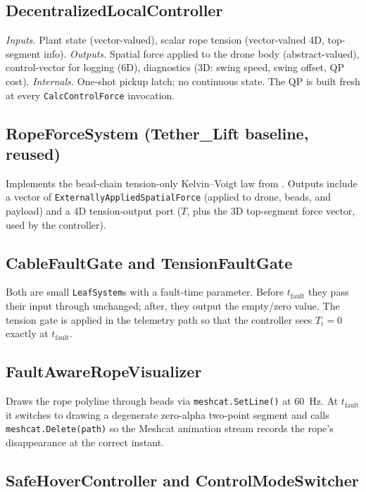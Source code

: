 \documentclass[11pt,a4paper,oneside]{report}
\begin{document}
\subsection{DecentralizedLocalController}

\emph{Inputs.} Plant state (vector-valued), scalar rope tension
(vector-valued 4D, top-segment info). \emph{Outputs.} Spatial force
applied to the drone body (abstract-valued), control-vector for
logging (6D), diagnostics (3D: swing speed, swing offset, QP cost).
\emph{Internals.} One-shot pickup latch; no continuous state. The QP
is built fresh at every \texttt{CalcControlForce} invocation.

\subsection{RopeForceSystem (Tether\_Lift baseline, reused)}

Implements the bead-chain tension-only Kelvin--Voigt law from
. Outputs include a vector of
\texttt{ExternallyAppliedSpatialForce} (applied to drone, beads, and
payload) and a 4D tension-output port ($T$, plus the 3D top-segment
force vector, used by the controller).

\subsection{CableFaultGate and TensionFaultGate}

Both are small \texttt{LeafSystem}s with a fault-time parameter.
Before $t_{\text{fault}}$ they pass their input through unchanged;
after, they output the empty/zero value. The tension gate is applied
in the telemetry path so that the controller sees $T_i=0$ exactly at
$t_{\text{fault}}$.

\subsection{FaultAwareRopeVisualizer}

Draws the rope polyline through beads via
\texttt{meshcat.SetLine()} at 60~Hz. At $t_{\text{fault}}$ it switches
to drawing a degenerate zero-alpha two-point segment and calls
\texttt{meshcat.Delete(path)} so the Meshcat animation stream records
the rope's disappearance at the correct instant.

\subsection{SafeHoverController and ControlModeSwitcher}
\end{document}
